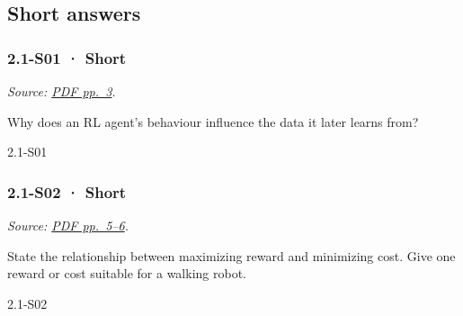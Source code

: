 \subsection{Short answers}\label{short-answers-3}

\noindent\begin{minipage}{\linewidth}

\subsubsection{2.1-S01 · Short}\label{s01-short-3}

\emph{Source:
\href{../Lecture\%20Slides/2.1.\%20Introduction\%20to\%20Reinforcement\%20Learning.pdf\#page=3}{PDF
pp.~3}.}

Why does an RL agent's behaviour influence the data it later learns
from?

\begin{solution}[20mm]{2.1-S01}

\end{solution}
\end{minipage}\par\medskip

\noindent\begin{minipage}{\linewidth}

\subsubsection{2.1-S02 · Short}\label{s02-short-3}

\emph{Source:
\href{../Lecture\%20Slides/2.1.\%20Introduction\%20to\%20Reinforcement\%20Learning.pdf\#page=5}{PDF
pp.~5--6}.}

State the relationship between maximizing reward and minimizing cost.
Give one reward or cost suitable for a walking robot.

\begin{solution}[20mm]{2.1-S02}

\end{solution}
\end{minipage}\par\medskip

